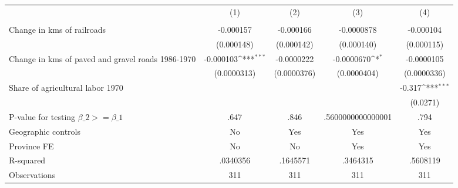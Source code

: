 {
\def\sym#1{\ifmmode^{#1}\else\(^{#1}\)\fi}
\begin{tabular}{l*{4}{c}}
\hline\hline
                &\multicolumn{1}{c}{(1)}&\multicolumn{1}{c}{(2)}&\multicolumn{1}{c}{(3)}&\multicolumn{1}{c}{(4)}\\
                &\multicolumn{1}{c}{}&\multicolumn{1}{c}{}&\multicolumn{1}{c}{}&\multicolumn{1}{c}{}\\
\hline
Change in kms of railroads&-0.000157         &-0.000166         &-0.0000878         &-0.000104         \\
                &(0.000148)         &(0.000142)         &(0.000140)         &(0.000115)         \\
[1em]
Change in kms of paved and gravel roads 1986-1970&-0.000103\sym{***}&-0.0000222         &-0.0000670\sym{*}  &-0.0000105         \\
                &(0.0000313)         &(0.0000376)         &(0.0000404)         &(0.0000336)         \\
[1em]
Share of agricultural labor 1970&                  &                  &                  &   -0.317\sym{***}\\
                &                  &                  &                  & (0.0271)         \\
\hline
P-value for testing $\beta\_{2} >= \beta\_{1}$&     .647         &     .846         &.5600000000000001         &     .794         \\
Geographic controls&       No         &      Yes         &      Yes         &      Yes         \\
Province FE     &       No         &       No         &      Yes         &      Yes         \\
R-squared       & .0340356         & .1645571         & .3464315         & .5608119         \\
Observations    &      311         &      311         &      311         &      311         \\
\hline\hline
\end{tabular}
}
